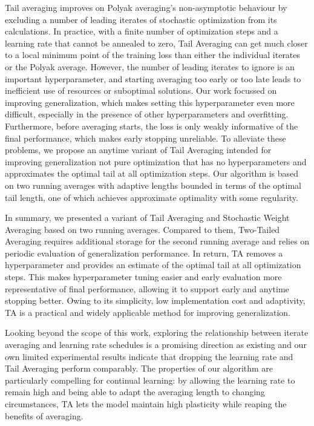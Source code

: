 \documentclass[twocolumn]{article}
\newcommand{\tta}{\textlf{2}TA}
\begin{document}
Tail averaging improves on Polyak averaging's non-asymptotic behaviour by excluding a number of leading iterates of stochastic optimization from its calculations.
In practice, with a finite number of optimization steps and a learning rate that cannot be annealed to zero, Tail Averaging can get much closer to a local minimum point of the training loss than either the individual iterates or the Polyak average.
However, the number of leading iterates to ignore is an important hyperparameter, and starting averaging too early or too late leads to inefficient use of resources or suboptimal solutions.
Our work focussed on improving generalization, which makes setting this hyperparameter even more difficult, especially in the presence of other hyperparameters and overfitting.
Furthermore, before averaging starts, the loss is only weakly informative of the final performance, which makes early stopping unreliable.
To alleviate these problems, we propose an anytime variant of Tail Averaging intended for improving generalization not pure optimization that has no hyperparameters and approximates the optimal tail at all optimization steps.
Our algorithm is based on two running averages with adaptive lengths bounded in terms of the optimal tail length, one of which achieves approximate optimality with some regularity.

In summary, we presented a variant of Tail Averaging and Stochastic Weight Averaging based on two running averages.
Compared to them, Two-Tailed Averaging requires additional storage for the second running average and relies on periodic evaluation of generalization performance.
In return, \tta{} removes a hyperparameter and provides an estimate of the optimal tail at all optimization steps.
This makes hyperparameter tuning easier and early evaluation more representative of final performance, allowing it to support early and anytime stopping better.
Owing to its simplicity, low implementation cost and adaptivity, \tta{} is a practical and widely applicable method for improving generalization.

Looking beyond the scope of this work, exploring the relationship between iterate averaging and learning rate schedules is a promising direction as existing \citep{merity2017regularizing} and our own limited experimental results indicate that dropping the learning rate and Tail Averaging perform comparably.
The properties of our algorithm are particularly compelling for continual learning: by allowing the learning rate to remain high and being able to adapt the averaging length to changing circumstances, \tta{} lets the model maintain high plasticity while reaping the benefits of averaging.
\end{document}
